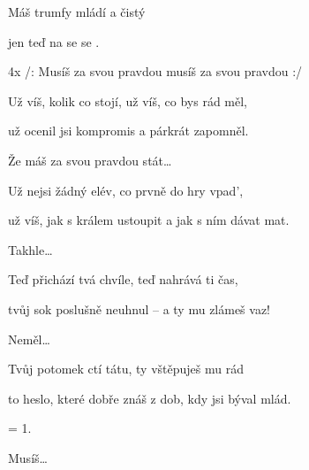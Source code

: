 

\zs
	Máš  trumfy mládí a  čistý 

	jen  teď  na  se se .
\ks

\zr
	4x /: Musíš za svou pravdou  musíš za svou pravdou  :/
\kr

\zs
	Už víš, kolik co stojí, už víš, co bys rád měl,

	už ocenil jsi kompromis a párkrát zapomněl.
\ks

\zr
	Že máš za svou pravdou stát\ldots
\kr

\zs
	Už nejsi žádný elév, co prvně do hry vpad',
	
	už víš, jak s králem ustoupit a jak s ním dávat mat.
\ks

\zr
	Takhle\ldots
\kr

\zs
	Teď přichází tvá chvíle, teď nahrává ti čas,
	
	tvůj sok poslušně neuhnul -- a ty mu zlámeš vaz!
\ks

\zr
	Neměl\ldots
\kr

\zs
	Tvůj potomek ctí tátu, ty vštěpuješ mu rád

   to heslo, které dobře znáš z dob, kdy jsi býval mlád.
\ks

\zs
	= 1.
\ks

\zr
	Musíš\ldots
\kr

\kp
